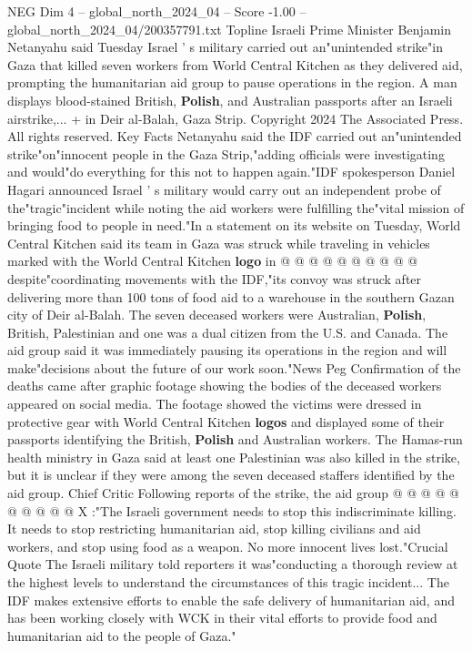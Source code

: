 \begin{textsample}{NEG Dim 4 – global\_north\_2024\_04 – Score -1.00 – global\_north\_2024\_04/200357791.txt}  \label{ex:f4_neg_093}
Topline Israeli Prime Minister Benjamin Netanyahu said Tuesday Israel ' s military carried out an"unintended strike"in Gaza that killed seven workers from World Central Kitchen as they delivered aid, prompting the humanitarian aid group to pause operations in the region.
A man displays blood-stained British, \textbf{Polish}, and Australian passports after an Israeli airstrike,... + in Deir al-Balah, Gaza Strip.
Copyright 2024 The Associated Press.
All rights reserved.
Key Facts Netanyahu said the IDF carried out an"unintended strike"on"innocent people in the Gaza Strip,"adding officials were investigating and would"do everything for this not to happen again."IDF spokesperson Daniel Hagari announced Israel ' s military would carry out an independent probe of the"tragic"incident while noting the aid workers were fulfilling the"vital mission of bringing food to people in need."In a statement on its website on Tuesday, World Central Kitchen said its team in Gaza was struck while traveling in vehicles marked with the World Central Kitchen \textbf{logo} in @ @ @ @ @ @ @ @ @ @ despite"coordinating movements with the IDF,"its convoy was struck after delivering more than 100 tons of food aid to a warehouse in the southern Gazan city of Deir al-Balah.
The seven deceased workers were Australian, \textbf{Polish}, British, Palestinian and one was a dual citizen from the U.S. and Canada.
The aid group said it was immediately pausing its operations in the region and will make"decisions about the future of our work soon."News Peg Confirmation of the deaths came after graphic footage showing the bodies of the deceased workers appeared on social media.
The footage showed the victims were dressed in protective gear with World Central Kitchen \textbf{logos} and displayed some of their passports identifying the British, \textbf{Polish} and Australian workers.
The Hamas-run health ministry in Gaza said at least one Palestinian was also killed in the strike, but it is unclear if they were among the seven deceased staffers identified by the aid group.
Chief Critic Following reports of the strike, the aid group @ @ @ @ @ @ @ @ @ @ X :"The Israeli government needs to stop this indiscriminate killing.
It needs to stop restricting humanitarian aid, stop killing civilians and aid workers, and stop using food as a weapon.
No more innocent lives lost."Crucial Quote The Israeli military told reporters it was"conducting a thorough review at the highest levels to understand the circumstances of this tragic incident...
The IDF makes extensive efforts to enable the safe delivery of humanitarian aid, and has been working closely with WCK in their vital efforts to provide food and humanitarian aid to the people of Gaza."

\end{textsample}
